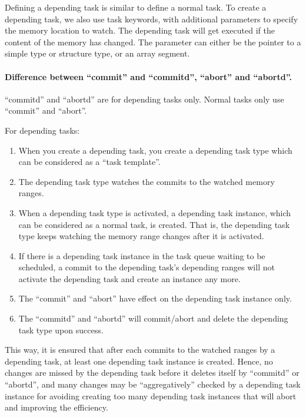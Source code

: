 \documentclass[a4paper]{article}
\begin{document}
Defining a depending task is similar to define a normal task.
To create a depending task, we also use task keywords, with additional parameters to specify the memory location to watch. The depending task will get executed if the content of the memory has changed. The parameter can either be the pointer to a simple type or structure type, or an array segment.

{{{}}}

\paragraph{Difference between ``commit'' and ``commitd'', ``abort'' and ``abortd''.} ``commitd'' and ``abortd'' are for depending tasks only. Normal tasks only use ``commit'' and ``abort''.

For depending tasks:

\begin{enumerate}
\item When you create a depending task, you create a depending task type which can be considered as a ``task template''.
\item The depending task type watches the commits to the watched memory ranges.
\item When a depending task type is activated, a depending task instance, which can be considered as a normal task, is created. That is, the depending task type keeps watching the memory range changes after it is activated.
\item If there is a depending task instance in the task queue waiting to be scheduled, a commit to the depending task's depending ranges will not activate the depending task and create an instance any more.
\item The ``commit'' and ``abort'' have effect on the depending task instance only.
\item The ``commitd'' and ``abortd'' will commit/abort and delete the depending task type upon success.
\end{enumerate}

This way, it is ensured that after each commits to the watched ranges by a depending task, at least one depending task instance is created. Hence, no changes are missed by the depending task before it deletes itself by ``commitd'' or ``abortd'', and many changes may be ``aggregatively'' checked by a depending task instance for avoiding creating too many depending task instances that will abort and improving the efficiency.
\end{document}
